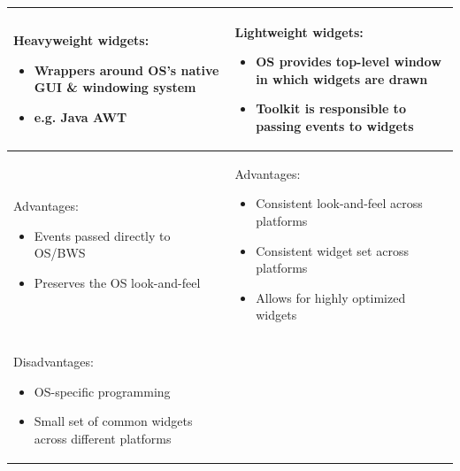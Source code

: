 \documentclass[11pt, oneside]{article}
\newenvironment{itemized}{\begin{itemize}[noitemsep, topsep=0pt, leftmargin=*]}{\end{itemize}}  %
\begin{document}
\hspace{-2em}
\begin{tabular}{|l|l|}
\hline
\begin{minipage}[t]{0.45\textwidth}
Heavyweight widgets:
    \begin{itemized}
    \item Wrappers around OS's native GUI \& windowing system 
    \item e.g. Java AWT
    \end{itemized}
    \vspace*{0.5em}
\end{minipage}
&
\begin{minipage}[t]{0.45\textwidth}
Lightweight widgets:
    \begin{itemized}
    \item OS provides top-level window in which widgets are drawn
    \item Toolkit is responsible to passing events to widgets
    \end{itemized}
    \vspace*{0.5em}
\end{minipage}  \\
\hline
\begin{minipage}[t]{0.45\textwidth}
Advantages:
    \begin{itemized}
    \item Events passed directly to OS/BWS
    \item Preserves the OS look-and-feel
    \end{itemized}
    \vspace*{0.5em}
\end{minipage}
&
\begin{minipage}[t]{0.45\textwidth}
Advantages:
    \begin{itemized}
    \item Consistent look-and-feel across platforms
    \item Consistent widget set across platforms
    \item Allows for highly optimized widgets
    \end{itemized}
    \vspace*{0.5em}
\end{minipage}  \\
\hline
\begin{minipage}[t]{0.45\textwidth}
Disadvantages:
    \begin{itemized}
    \item OS-specific programming
    \item Small set of common widgets across different platforms

\end{itemized}
\end{minipage}
\end{tabular}
\end{document}
